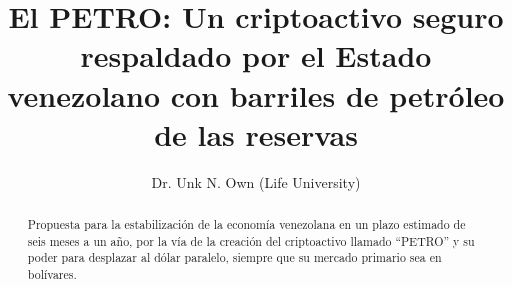 \documentclass[spanish,letterpaper,11pt]{article}
\title{\bf El  PETRO: Un criptoactivo seguro respaldado por el Estado venezolano con barriles de petróleo de las reservas}
\author{
     Dr. Unk N. Own (Life University)\\
}
\date{}
\begin{document}

\maketitle

\begin{abstract}
Propuesta para la estabilización de la economía venezolana en un plazo estimado de seis meses a un año, por la vía de la creación del criptoactivo llamado “PETRO” y su poder para desplazar al dólar paralelo, siempre que su mercado primario sea en bolívares.
\end{abstract}

\setlength{\columnsep}{20pt}

\tableofcontents












\renewcommand{\appendixname}{Anexos}
\begin{appendices} %




%

\end{appendices}
\end{document}
